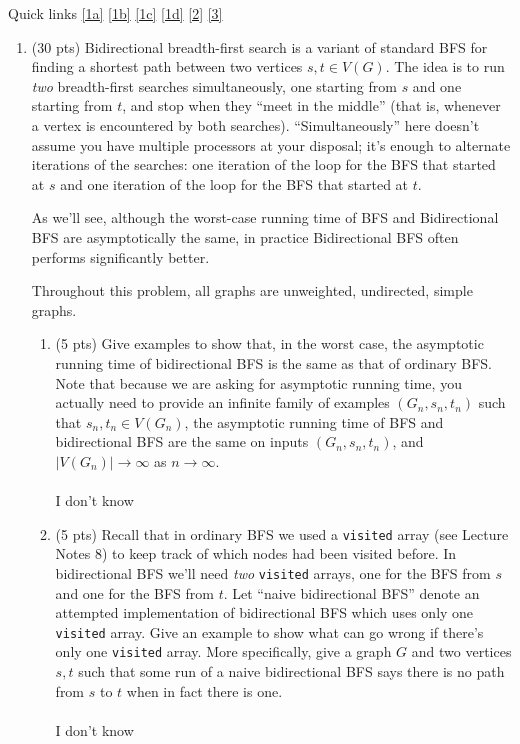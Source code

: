 \documentclass[12pt]{article}
\begin{document}
\renewcommand{\headrulewidth}{0.5pt}
\phantom{Test}

Quick links \ref{1a} \ref{1b} \ref{1c} \ref{1d} \ref{2} \ref{3}


\vspace{-3mm}
\begin{enumerate}

	\item (30 pts) Bidirectional breadth-first search is a variant of standard BFS for finding a shortest path between two vertices $s,t \in V(G)$. The idea is to run \emph{two} breadth-first searches simultaneously, one starting from $s$ and one starting from $t$, and stop when they ``meet in the middle'' (that is, whenever a vertex is encountered by both searches). ``Simultaneously'' here doesn't assume you have multiple processors at your disposal; it's enough to alternate iterations of the searches: one iteration of the loop for the BFS that started at $s$ and one iteration of the loop for the BFS that started at $t$.
	
	As we'll see, although the worst-case running time of BFS and Bidirectional BFS are asymptotically the same, in practice Bidirectional BFS often performs significantly better.
	
	Throughout this problem, all graphs are unweighted, undirected, simple graphs.
	
	\begin{enumerate}
	\item \label{1a} (5 pts) Give examples to show that, in the worst case, the asymptotic running time of bidirectional BFS is the same as that of ordinary BFS. Note that because we are asking for asymptotic running time, you actually need to provide an infinite family of examples $(G_n, s_n, t_n)$ such that $s_n,t_n \in V(G_n)$, the asymptotic running time of BFS and bidirectional BFS are the same on inputs $(G_n, s_n, t_n)$, and $|V(G_n)| \to \infty$ as $n \to \infty$.
	\\ \\ I don't know
	\pagebreak
	
	\item \label{1b} (5 pts) Recall that in ordinary BFS we used a \texttt{visited} array (see Lecture Notes 8) to keep track of which nodes had been visited before. In bidirectional BFS we'll need \emph{two} \texttt{visited} arrays, one for the BFS from $s$ and one for the BFS from $t$. Let ``naive bidirectional BFS'' denote an attempted implementation of bidirectional BFS which uses only one {\tt visited} array.  Give an example to show what can go wrong if there's only one \texttt{visited} array. More specifically, give a graph $G$ and two vertices $s,t$ such that some run of a naive bidirectional BFS says there is no path from $s$ to $t$ when in fact there is one.
	\\ \\ I don't know
	\pagebreak
	

\end{enumerate}
\end{enumerate}
\end{document}
